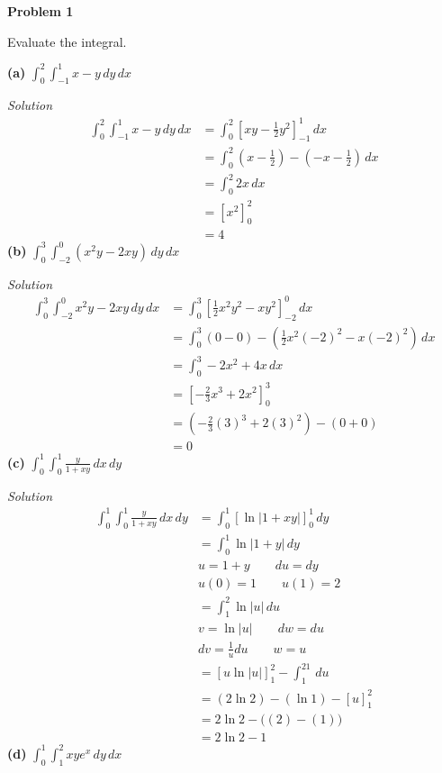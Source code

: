 \documentclass{article}
\newcommand{\lrp}[1]{\left( #1 \right)}
\newcommand{\lrb}[1]{\left[ #1 \right]}
\newcommand{\Solution}{\textit{Solution}}
\begin{document}
\textbf{Problem 1}

Evaluate the integral.

\textbf{(a)} $\displaystyle \int_0^2\!\int_{-1}^{1}x-y \,dy \,dx$

\Solution
\begin{align*}
    \int_0^2\!\int_{-1}^{1}x-y \,dy \,dx&=\int_0^2\left[xy-\frac{1}{2}y^2\right]_{-1}^{1}\,dx\\
    &=\int_0^2\left(x-\frac{1}{2}\right)-\lrp{-x-\frac{1}{2}}\,dx\\
    &=\int_0^2 2x\,dx\\
    &=\left[x^2\right]_0^2\\
    &=\boxed{4}
\end{align*}
\textbf{(b)} $\displaystyle \int_0^3\int_{-2}^0(x^2y-2xy)\,dy\,dx$

\Solution
\begin{align*}
    \int_0^3\int_{-2}^0x^2y-2xy\,dy\,dx&=\int_0^3\lrb{\frac{1}{2}x^2y^2-xy^2}_{-2}^0\,dx\\
    &=\int_0^3\lrp{0-0}-\lrp{\frac{1}{2}x^2(-2)^2-x(-2)^2}\,dx\\
    &=\int_0^3 -2x^2+4x\,dx\\
    &=\lrb{-\frac{2}{3}x^3+2x^2}_0^3\\
    &=\lrp{-\frac{2}{3}(3)^3+2(3)^2}-(0+0)\\
    &=\boxed{0}
\end{align*}
\newpage
\textbf{(c)} $\displaystyle \int_0^1\int_0^1\frac{y}{1+xy}\,dx\,dy$

\Solution
\begin{align*}
    \int_0^1\int_0^1\frac{y}{1+xy}\,dx\,dy&=\int_0^1\lrb{\ln\left|1+xy\right|}_0^1\,dy\\
    &=\int_0^1\ln\left|1+y\right|\,dy\\
    &u=1+y\hspace{2em}du=dy\\
    &u(0)=1\hspace{2em}u(1)=2\\
    &=\int_1^2\ln|u|\,du\\
    &v=\ln\left|u\right|\hspace{2em}dw=du\\
    &dv=\frac{1}{u}du\hspace{2em}w=u\\
    &=\lrb{u\ln\left|u\right|}_1^2-\int_1^21\,du\\
    &=(2\ln 2)-(\ln 1) - \lrb{u}_1^2\\
    &=2\ln 2 - \big((2)-(1)\big)\\
    &=\boxed{2\ln 2 - 1}
\end{align*}
\textbf{(d)} $\displaystyle \int_0^1\int_1^2xye^x\,dy\,dx$
\end{document}
